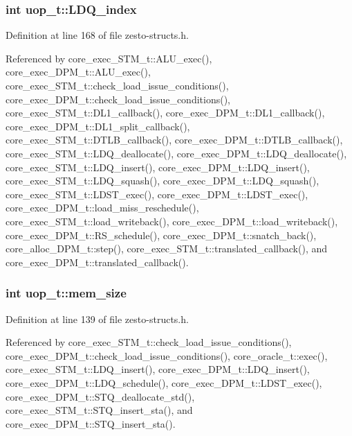\subsubsection[{LDQ\_\-index}]{\setlength{\rightskip}{0pt plus 5cm}int {\bf uop\_\-t::LDQ\_\-index}}\label{structuop__t_d058a7ec11bfd9e8174d4bc77570512c}




Definition at line 168 of file zesto-structs.h.

Referenced by core\_\-exec\_\-STM\_\-t::ALU\_\-exec(), core\_\-exec\_\-DPM\_\-t::ALU\_\-exec(), core\_\-exec\_\-STM\_\-t::check\_\-load\_\-issue\_\-conditions(), core\_\-exec\_\-DPM\_\-t::check\_\-load\_\-issue\_\-conditions(), core\_\-exec\_\-STM\_\-t::DL1\_\-callback(), core\_\-exec\_\-DPM\_\-t::DL1\_\-callback(), core\_\-exec\_\-DPM\_\-t::DL1\_\-split\_\-callback(), core\_\-exec\_\-STM\_\-t::DTLB\_\-callback(), core\_\-exec\_\-DPM\_\-t::DTLB\_\-callback(), core\_\-exec\_\-STM\_\-t::LDQ\_\-deallocate(), core\_\-exec\_\-DPM\_\-t::LDQ\_\-deallocate(), core\_\-exec\_\-STM\_\-t::LDQ\_\-insert(), core\_\-exec\_\-DPM\_\-t::LDQ\_\-insert(), core\_\-exec\_\-STM\_\-t::LDQ\_\-squash(), core\_\-exec\_\-DPM\_\-t::LDQ\_\-squash(), core\_\-exec\_\-STM\_\-t::LDST\_\-exec(), core\_\-exec\_\-DPM\_\-t::LDST\_\-exec(), core\_\-exec\_\-DPM\_\-t::load\_\-miss\_\-reschedule(), core\_\-exec\_\-STM\_\-t::load\_\-writeback(), core\_\-exec\_\-DPM\_\-t::load\_\-writeback(), core\_\-exec\_\-DPM\_\-t::RS\_\-schedule(), core\_\-exec\_\-DPM\_\-t::snatch\_\-back(), core\_\-alloc\_\-DPM\_\-t::step(), core\_\-exec\_\-STM\_\-t::translated\_\-callback(), and core\_\-exec\_\-DPM\_\-t::translated\_\-callback().
\subsubsection[{mem\_\-size}]{\setlength{\rightskip}{0pt plus 5cm}int {\bf uop\_\-t::mem\_\-size}}\label{structuop__t_58a7c8e6a49a879b290148211ac08e5a}




Definition at line 139 of file zesto-structs.h.

Referenced by core\_\-exec\_\-STM\_\-t::check\_\-load\_\-issue\_\-conditions(), core\_\-exec\_\-DPM\_\-t::check\_\-load\_\-issue\_\-conditions(), core\_\-oracle\_\-t::exec(), core\_\-exec\_\-STM\_\-t::LDQ\_\-insert(), core\_\-exec\_\-DPM\_\-t::LDQ\_\-insert(), core\_\-exec\_\-DPM\_\-t::LDQ\_\-schedule(), core\_\-exec\_\-DPM\_\-t::LDST\_\-exec(), core\_\-exec\_\-DPM\_\-t::STQ\_\-deallocate\_\-std(), core\_\-exec\_\-STM\_\-t::STQ\_\-insert\_\-sta(), and core\_\-exec\_\-DPM\_\-t::STQ\_\-insert\_\-sta().
